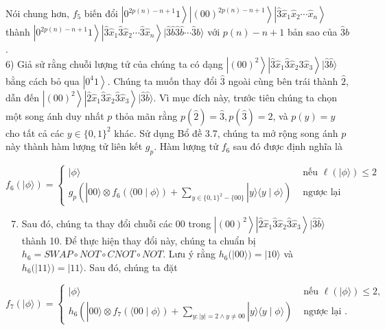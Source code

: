 \documentclass[10pt]{article}
\begin{document}
Nói chung hơn, $f_{5}$ biến đổi $\left|0^{2 p(n)-n+1} 1\right\rangle\left|(00)^{2 p(n)-n+1}\right\rangle\left|\hat{3} \hat{x}_{1} \hat{x}_{2} \cdots \hat{x}_{n}\right\rangle \quad$ thành $\left|0^{2 p(n)-n+1} 1\right\rangle\left|\hat{3} \hat{x}_{1} \hat{3} \hat{x}_{2} \cdots \hat{3} \hat{x}_{n}\right\rangle|\hat{3} \hat{b} \hat{3} \hat{b} \cdots \hat{3} \hat{b}\rangle$ với $p(n)-n+1$ bản sao của $\hat{3} \hat{b}$.\\
6) Giả sử rằng chuỗi lượng tử của chúng ta có dạng $\left|(00)^{2}\right\rangle\left|\hat{3} \hat{x}_{1} \hat{3} \hat{x}_{2} \hat{3} \hat{x}_{3}\right\rangle|\hat{3} \hat{b}\rangle$ bằng cách bỏ qua $\left|0^{4} 1\right\rangle$. Chúng ta muốn thay đổi $\hat{3}$ ngoài cùng bên trái thành $\hat{2}$, dẫn đến $\left|(00)^{2}\right\rangle\left|\hat{2} \hat{x}_{1} \hat{3} \hat{x}_{2} \hat{3} \hat{x}_{3}\right\rangle|\hat{3} \hat{b}\rangle$. Vì mục đích này, trước tiên chúng ta chọn một song ánh duy nhất $p$ thỏa mãn rằng $p(\hat{2})=\hat{3}, p(\hat{3})=\hat{2}$, và $p(y)=y$ cho tất cả các $y \in\{0,1\}^{2}$ khác. Sử dụng Bổ đề 3.7, chúng ta mở rộng song ánh $p$ này thành hàm lượng tử liên kết $g_{p}$. Hàm lượng tử $f_{6}$ sau đó được định nghĩa là

$$
f_{6}(|\phi\rangle)= \begin{cases}|\phi\rangle & \text { nếu } \ell(|\phi\rangle) \leq 2 \\ g_{p}\left(|00\rangle \otimes f_{6}(\langle 00 \mid \phi\rangle)+\sum_{y \in\{0,1\}^{2}-\{00\}}|y\rangle\langle y \mid \phi\rangle\right) & \text { ngược lại }\end{cases}
$$

\begin{enumerate}
  \setcounter{enumi}{6}
  \item Sau đó, chúng ta thay đổi chuỗi các 00 trong $\left|(00)^{2}\right\rangle\left|\hat{2} \hat{x}_{1} \hat{3} \hat{x}_{2} \hat{3} \hat{x}_{3}\right\rangle|\hat{3} \hat{b}\rangle$ thành 10. Để thực hiện thay đổi này, chúng ta chuẩn bị $h_{6}=S W A P \circ N O T \circ C N O T \circ N O T$. Lưu ý rằng $h_{6}(|00\rangle)=|10\rangle$ và $h_{6}(|11\rangle)=|11\rangle$. Sau đó, chúng ta đặt
\end{enumerate}

$$
f_{7}(|\phi\rangle)= \begin{cases}|\phi\rangle & \text { nếu } \ell(|\phi\rangle) \leq 2, \\ h_{6}\left(|00\rangle \otimes f_{7}(\langle 00 \mid \phi\rangle)+\sum_{y:|y|=2 \wedge y \neq 00}|y\rangle\langle y \mid \phi\rangle\right) & \text { ngược lại } .\end{cases}
$$
\end{document}
